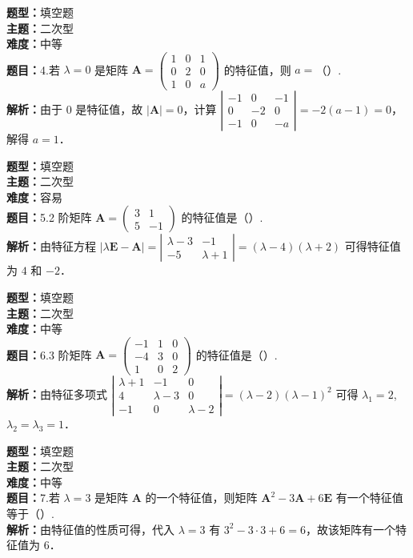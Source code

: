 \documentclass{ctexart}
\newenvironment{question}[5]{%
	\noindent\textbf{题型：}#1\\
	\textbf{主题：}#2\\
	\textbf{难度：}#3\\
	\textbf{题目：}#4\\
	\textbf{解析：}#5\\
	\vspace{1em}
}{}
\begin{document}
	\begin{question}
		{填空题}
		{二次型}
		{中等}
		{4.若 \(\lambda=0\) 是矩阵 \(\mathbf{A}=\left(\begin{array}{ccc}1 & 0 & 1 \\ 0 & 2 & 0 \\ 1 & 0 & a\end{array}\right)\) 的特征值，则 \(a=\)（）. }
		{由于 \(0\) 是特征值，故 \(|\mathbf{A}| = 0\)，计算 \(\left|\begin{array}{ccc}-1 & 0 & -1 \\ 0 & -2 & 0 \\ -1 & 0 & -a\end{array}\right| = -2(a - 1) = 0\)，解得 \(a = 1\)．}
	\end{question}
	
	\begin{question}
		{填空题}
		{二次型}
		{容易}
		{5.2 阶矩阵 \(\mathbf{A}=\left(\begin{array}{cc}3 & 1 \\ 5 & -1\end{array}\right)\) 的特征值是（）. }
		{由特征方程 \(|\lambda \mathbf{E} - \mathbf{A}| = \left|\begin{array}{cc}\lambda - 3 & -1 \\ -5 & \lambda + 1\end{array}\right| = (\lambda - 4)(\lambda + 2)\) 可得特征值为 \(4\) 和 \(-2\)．}
	\end{question}
	
	\begin{question}
		{填空题}
		{二次型}
		{中等}
		{6.3 阶矩阵 \(\mathbf{A}=\left(\begin{array}{ccc}-1 & 1 & 0 \\ -4 & 3 & 0 \\ 1 & 0 & 2\end{array}\right)\) 的特征值是（）. }
		{由特征多项式 \(\left|\begin{array}{ccc}\lambda + 1 & -1 & 0 \\ 4 & \lambda - 3 & 0 \\ -1 & 0 & \lambda - 2\end{array}\right| = (\lambda - 2)(\lambda - 1)^2\) 可得 \(\lambda_1 = 2\), \(\lambda_2 = \lambda_3 = 1\)．}
	\end{question}
	
	\begin{question}
		{填空题}
		{二次型}
		{中等}
		{7.若 \(\lambda=3\) 是矩阵 \(\mathbf{A}\) 的一个特征值，则矩阵 \(\mathbf{A}^2 - 3\mathbf{A} + 6\mathbf{E}\) 有一个特征值等于（）. }
		{由特征值的性质可得，代入 \(\lambda = 3\) 有 \(3^2 - 3 \cdot 3 + 6 = 6\)，故该矩阵有一个特征值为 6．}
	\end{question}
	
\end{document}
